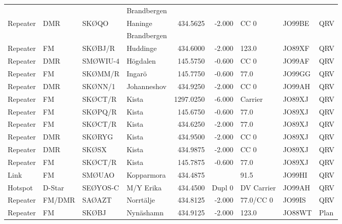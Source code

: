 \begin{landscape}
\begin{longtable}{llllrrlll}
         &             &          & Brandbergen &              &            &            &             &          \\
Repeater & DMR         & SKØQO    & Haninge     & 434.5625     & -2.000     & CC 0       & JO99BE      & QRV      \\
         &             &          & Brandbergen &              &            &            &             &          \\
Repeater & FM          & SKØBJ/R  & Huddinge    & 434.6000     & -2.000     & 123.0      & JO89XF      & QRV      \\
Repeater & DMR         & SMØWIU-4 & Högdalen    & 145.5750     & -0.600     & CC 0       & JO99AF      & QRV      \\
Repeater & FM          & SKØMM/R  & Ingarö      & 145.7750     & -0.600     & 77.0       & JO99GG      & QRV      \\
Repeater & DMR         & SKØNN/1  & Johanneshov & 434.9250     & -2.000     & CC 0       & JO99AH      & QRV      \\
Repeater & FM          & SKØCT/R  & Kista       & 1297.0250    & -6.000     & Carrier    & JO89XJ      & QRV      \\
Repeater & FM          & SKØPQ/R  & Kista       & 145.6750     & -0.600     & 77.0       & JO89XJ      & QRV      \\
Repeater & FM          & SKØCT/R  & Kista       & 434.6250     & -2.000     & 77.0       & JO89XJ      & QRV      \\
Repeater & DMR         & SKØRYG   & Kista       & 434.9500     & -2.000     & CC 0       & JO89XJ      & QRV      \\
Repeater & DMR         & SKØSX    & Kista       & 434.9875     & -2.000     & CC 0       & JO89XJ      & QRV      \\
Repeater & FM          & SKØCT/R  & Kista       & 145.7875     & -0.600     & 77.0       & JO89XJ      & QRV      \\
Link     & FM          & SMØUAO   & Kopparmora  & 434.4875     &            & 91.5       & JO99HI      & QRV      \\
Hotspot  & D-Star      & SEØYOS-C & M/Y Erika   & 434.4500     & Dupl 0     & DV Carrier & JO99AH      & QRV      \\
Repeater & FM/DMR      & SAØAZT   & Norrtälje   & 434.8125     & -2.000     & 77.0/CC 0  & JO99IS      & QRV      \\
Repeater & FM          & SKØBJ    & Nynäshamn   & 434.9125     & -2.000     & 123.0      & JO88WT      & Plan     \\

\end{longtable}
\end{landscape}
